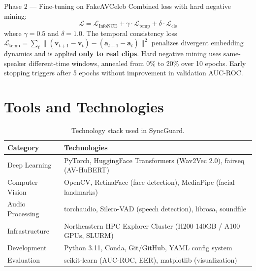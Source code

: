 \documentclass[12pt, letterpaper]{article}
\begin{document}
\begin{infobox}{Phase 2 — Fine-tuning on FakeAVCeleb}
Combined loss with hard negative mining:
\begin{equation}
    \mathcal{L} = \mathcal{L}_{\text{InfoNCE}} + \gamma \cdot \mathcal{L}_{\text{temp}} + \delta \cdot \mathcal{L}_{\text{cls}}
\end{equation}
where $\gamma = 0.5$ and $\delta = 1.0$. The temporal consistency loss $\mathcal{L}_{\text{temp}} = \sum_t \|(\mathbf{v}_{t+1} - \mathbf{v}_t) - (\mathbf{a}_{t+1} - \mathbf{a}_t)\|^2$ penalizes divergent embedding dynamics and is applied \textbf{only to real clips}. Hard negative mining uses same-speaker different-time windows, annealed from 0\% to 20\% over 10 epochs. Early stopping triggers after 5 epochs without improvement in validation AUC-ROC.
\end{infobox}

\section{Tools and Technologies}

\renewcommand{\arraystretch}{1.6}
\begin{table}[H]
\centering
\begin{tabularx}{\textwidth}{@{} p{3cm} X @{}}
\toprule
\textbf{Category} & \textbf{Technologies} \\
\midrule
Deep Learning & PyTorch, HuggingFace Transformers (Wav2Vec 2.0), fairseq (AV-HuBERT) \\
Computer Vision & OpenCV, RetinaFace (face detection), MediaPipe (facial landmarks) \\
Audio Processing & torchaudio, Silero-VAD (speech detection), librosa, soundfile \\
Infrastructure & Northeastern HPC Explorer Cluster (H200 140GB / A100 GPUs, SLURM) \\
Development & Python 3.11, Conda, Git/GitHub, YAML config system \\
Evaluation & scikit-learn (AUC-ROC, EER), matplotlib (visualization) \\
\bottomrule
\end{tabularx}
\caption{Technology stack used in SyncGuard.}
\end{table}
\renewcommand{\arraystretch}{1.0}
\end{document}

